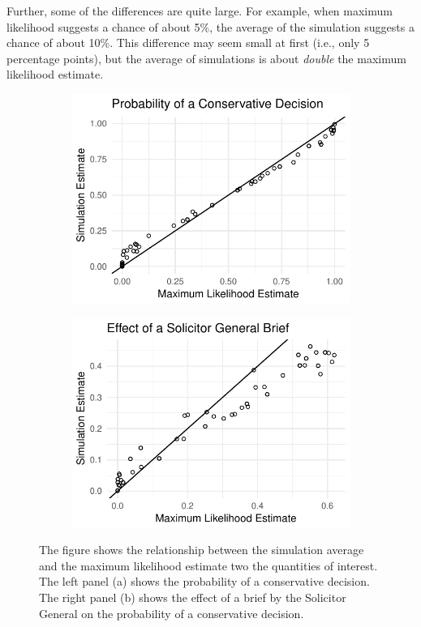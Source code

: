 \documentclass[11pt]{article}
\begin{document}
Further, some of the differences are quite large.
For example, when maximum likelihood suggests a chance of about 5\%, the average of the simulation suggests a chance of about 10\%.
This difference may seem small at first (i.e., only 5 percentage points), but the average of simulations is about \textit{double} the maximum likelihood estimate.

\begin{figure}[h!]
\begin{subfigure}{.5\textwidth}
  \centering
  \includegraphics[width=.8\linewidth]{figs/ge-pr.pdf}
  \caption{}
  \label{fig:ge1}
\end{subfigure}%
\begin{subfigure}{.5\textwidth}
  \centering
  \includegraphics[width=.8\linewidth]{figs/ge-fd.pdf}
  \caption{}
  \label{fig:ge2}
\end{subfigure}
\caption{The figure shows the relationship between the simulation average and the maximum likelihood estimate two the quantities of interest.
The left panel (a) shows the probability of a conservative decision.
The right panel (b) shows the effect of a brief by the Solicitor General on the probability of a conservative decision.}
\label{fig:ge}
\end{figure}
\end{document}
